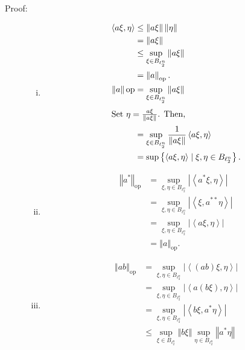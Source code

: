 \documentclass[9pt]{extarticle}
\newcommand{\iprod}[2]{\left\langle #1,#2\right\rangle}
\newcommand{\norm}[1]{\left\Vert #1\right\Vert}
\begin{document}
  \begin{description}
    \item[Proof:]\hfill
      \begin{enumerate}[(i)]
        \item 
          \begin{align*}
            \iprod{a\xi}{\eta} &\leq \norm{a\xi}\norm{\eta}\\
                               &= \norm{a\xi}\\
                               &\leq \sup_{\xi\in B_{\ell_2^{n}}}\norm{a\xi}\\
                               &= \norm{a}_{\text{op}}.\\
            \norm{a}{\text{op}} &= \sup_{\xi\in B_{\ell_2^{n}}}\norm{a\xi}\\
            \intertext{Set $\eta = \frac{a\xi}{\norm{a\xi}}$. Then,}
                                &= \sup_{\xi \in B_{\ell_2^{n}}} \frac{1}{\norm{a\xi}}\iprod{a\xi}{\eta}\\
                                &= \sup \left\{\iprod{a\xi}{\eta}\mid \xi,\eta \in B_{\ell_2^n}\right\}.
          \end{align*}
        \item
          \begin{align*}
            \norm{a^{\ast}}_{\text{op}} &= \sup_{\xi,\eta \in B_{\ell_2^n}}|\iprod{a^{\ast}\xi}{\eta}|\\
                                        &= \sup_{\xi,\eta\in B_{\ell_{2}^n}}|\iprod{\xi}{a^{\ast\ast}\eta}|\tag*{definition of conjugate transpose}\\
                                        &= \sup_{\xi,\eta\in B_{\ell_2^n}}|\iprod{a\xi}{\eta}| \tag*{by absolute value}\\
                                        &= \norm{a}_{\text{op}}.
          \end{align*}
        \item
          \begin{align*}
            \norm{ab}_{\text{op}} &= \sup_{\xi,\eta\in B_{\ell_2^n}} |\iprod{(ab)\xi}{\eta}|\\
                                  &= \sup_{\xi,\eta\in B_{\ell_2^n}}|\iprod{a(b\xi)}{\eta}|\\
                                  &= \sup_{\xi,\eta\in B_{\ell_2^n}}|\iprod{b\xi}{a^{\ast}\eta}|\\
                                  &\leq \sup_{\xi\in B_{\ell_2^n}}\norm{b\xi}\sup_{\eta\in B_{\ell_2^n}}\norm{a^{*}\eta}\\

\end{align*}
\end{enumerate}
\end{description}
\end{document}
